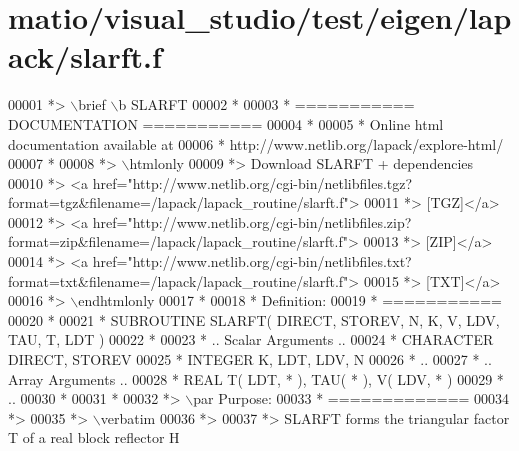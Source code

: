 \hypertarget{matio_2visual__studio_2test_2eigen_2lapack_2slarft_8f_source}{}\section{matio/visual\+\_\+studio/test/eigen/lapack/slarft.f}
\label{matio_2visual__studio_2test_2eigen_2lapack_2slarft_8f_source}

\begin{DoxyCode}
00001 \textcolor{comment}{*> \(\backslash\)brief \(\backslash\)b SLARFT}
00002 \textcolor{comment}{*}
00003 \textcolor{comment}{*  =========== DOCUMENTATION ===========}
00004 \textcolor{comment}{*}
00005 \textcolor{comment}{* Online html documentation available at }
00006 \textcolor{comment}{*            http://www.netlib.org/lapack/explore-html/ }
00007 \textcolor{comment}{*}
00008 \textcolor{comment}{*> \(\backslash\)htmlonly}
00009 \textcolor{comment}{*> Download SLARFT + dependencies }
00010 \textcolor{comment}{*> <a
       href="http://www.netlib.org/cgi-bin/netlibfiles.tgz?format=tgz&filename=/lapack/lapack\_routine/slarft.f"> }
00011 \textcolor{comment}{*> [TGZ]</a> }
00012 \textcolor{comment}{*> <a
       href="http://www.netlib.org/cgi-bin/netlibfiles.zip?format=zip&filename=/lapack/lapack\_routine/slarft.f"> }
00013 \textcolor{comment}{*> [ZIP]</a> }
00014 \textcolor{comment}{*> <a
       href="http://www.netlib.org/cgi-bin/netlibfiles.txt?format=txt&filename=/lapack/lapack\_routine/slarft.f"> }
00015 \textcolor{comment}{*> [TXT]</a>}
00016 \textcolor{comment}{*> \(\backslash\)endhtmlonly }
00017 \textcolor{comment}{*}
00018 \textcolor{comment}{*  Definition:}
00019 \textcolor{comment}{*  ===========}
00020 \textcolor{comment}{*}
00021 \textcolor{comment}{*       SUBROUTINE SLARFT( DIRECT, STOREV, N, K, V, LDV, TAU, T, LDT )}
00022 \textcolor{comment}{* }
00023 \textcolor{comment}{*       .. Scalar Arguments ..}
00024 \textcolor{comment}{*       CHARACTER          DIRECT, STOREV}
00025 \textcolor{comment}{*       INTEGER            K, LDT, LDV, N}
00026 \textcolor{comment}{*       ..}
00027 \textcolor{comment}{*       .. Array Arguments ..}
00028 \textcolor{comment}{*       REAL               T( LDT, * ), TAU( * ), V( LDV, * )}
00029 \textcolor{comment}{*       ..}
00030 \textcolor{comment}{*  }
00031 \textcolor{comment}{*}
00032 \textcolor{comment}{*> \(\backslash\)par Purpose:}
00033 \textcolor{comment}{*  =============}
00034 \textcolor{comment}{*>}
00035 \textcolor{comment}{*> \(\backslash\)verbatim}
00036 \textcolor{comment}{*>}
00037 \textcolor{comment}{*> SLARFT forms the triangular factor T of a real block reflector H}

\end{DoxyCode}
